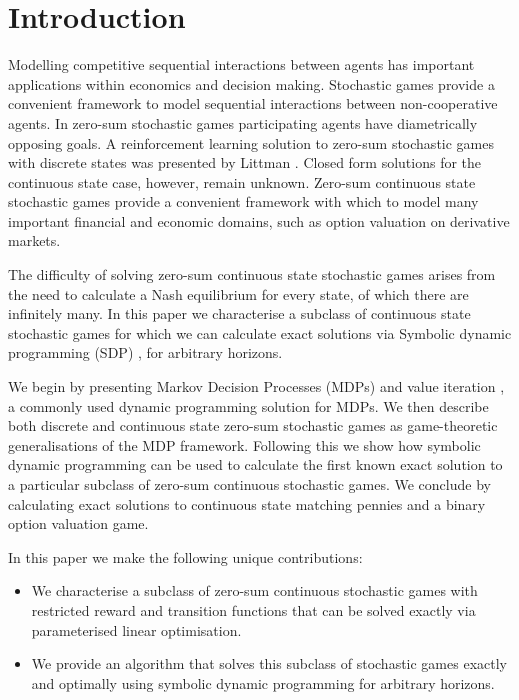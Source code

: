 \section{Introduction}

Modelling competitive sequential interactions between agents has 
important applications within economics and decision making. 
Stochastic games \cite{Shapley_PotNAoS_1953} provide a convenient framework 
to model sequential interactions between non-cooperative agents. In 
zero-sum stochastic games participating agents have diametrically 
opposing goals. A reinforcement learning solution to zero-sum stochastic
games with discrete states was presented by Littman \cite{Littman_ICML_1994}.
Closed form solutions for the continuous state case, however, remain unknown. 
Zero-sum continuous state stochastic games provide a convenient framework with 
which to model many important financial and economic domains, such 
as option valuation on derivative markets.

The difficulty of solving zero-sum continuous state stochastic games
arises from the need to calculate a Nash equilibrium for every state,
of which there are infinitely many. In this paper we characterise a subclass of 
continuous state stochastic games for which we can calculate exact solutions
via Symbolic dynamic programming (SDP)  \cite{Boutilier_IJCAI_2001},
for arbitrary horizons.

We begin by presenting Markov Decision Processes (MDPs) \cite{Howard_1960} 
and value iteration \cite{Bellman_1957}, a commonly used dynamic programming
solution for MDPs. We then describe both discrete and continuous state 
zero-sum stochastic games as game-theoretic generalisations of the MDP framework. 
Following this we show how symbolic dynamic programming
can be used to calculate the first known exact solution to a particular subclass of 
zero-sum continuous stochastic games. We conclude by calculating
exact solutions to continuous state matching pennies and a binary
option valuation game.

In this paper we make the following unique contributions:
\begin{itemize}
  \item   We characterise a subclass of zero-sum continuous stochastic games
            with restricted reward and transition functions that can be solved exactly
            via parameterised linear optimisation.
  \item  We provide an algorithm that solves this subclass of stochastic games exactly and 
            optimally using symbolic dynamic programming for arbitrary horizons.
\end{itemize}

